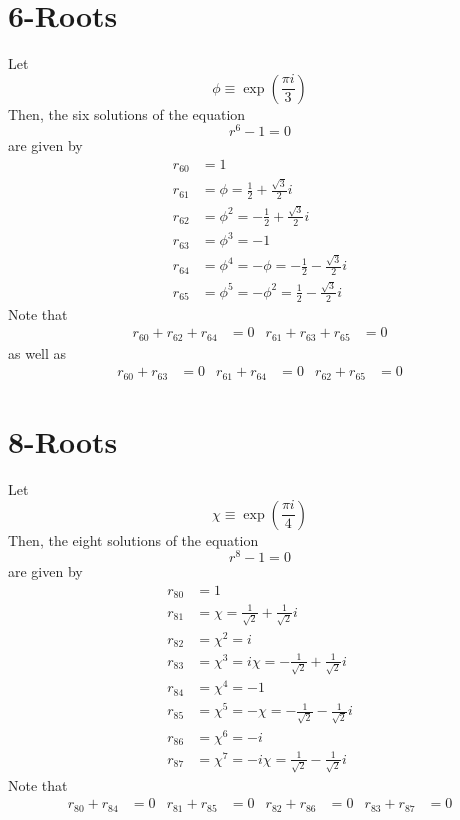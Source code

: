 \section{6-Roots}
Let
\begin{equation}
    \phi \equiv \exp\left( \frac{\pi i}{3} \right)
\end{equation}
Then, the six solutions of the equation
\begin{equation}
    r^{6} - 1 = 0
\end{equation}
are given by
\begin{align}
    r_{60} &= 1 \\
    r_{61} &= \phi = \frac{1}{2} + \frac{\sqrt{3}}{2}i \\
    r_{62} &= \phi^{2} = -\frac{1}{2} + \frac{\sqrt{3}}{2}i \\
    r_{63} &= \phi^{3} = -1 \\
    r_{64} &= \phi^{4} = -\phi = -\frac{1}{2} - \frac{\sqrt{3}}{2}i \\
    r_{65} &= \phi^{5} = -\phi^{2} = \frac{1}{2} - \frac{\sqrt{3}}{2}i
\end{align}
Note that
\begin{align}
    r_{60} + r_{62} + r_{64} &= 0 & r_{61} + r_{63} + r_{65} &= 0
\end{align}
as well as
\begin{align}
    r_{60} + r_{63} &= 0 & r_{61} + r_{64} &= 0 & r_{62} + r_{65} &= 0
\end{align}
\section{8-Roots}
Let
\begin{equation}
    \chi \equiv \exp\left( \frac{\pi i}{4} \right)
\end{equation}
Then, the eight solutions of the equation
\begin{equation}
    r^{8} - 1 = 0
\end{equation}
are given by
\begin{align}
    r_{80} &= 1 \\
    r_{81} &= \chi = \frac{1}{\sqrt{2}} + \frac{1}{\sqrt{2}}i \\
    r_{82} &= \chi^{2} = i \\
    r_{83} &= \chi^{3} = i \chi = -\frac{1}{\sqrt{2}} + \frac{1}{\sqrt{2}}i \\
    r_{84} &= \chi^{4} = -1 \\
    r_{85} &= \chi^{5} = -\chi = -\frac{1}{\sqrt{2}} - \frac{1}{\sqrt{2}}i \\
    r_{86} &= \chi^{6} = -i \\
    r_{87} &= \chi^{7} = -i \chi = \frac{1}{\sqrt{2}} - \frac{1}{\sqrt{2}}i
\end{align}
Note that
\begin{align}
    r_{80} + r_{84} &= 0 & r_{81} + r_{85} &= 0 & r_{82} + r_{86} &= 0 & r_{83} + r_{87} &= 0
\end{align}
